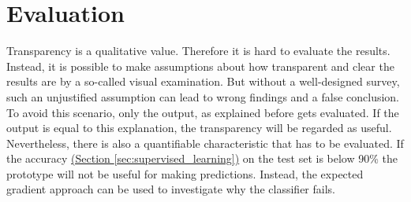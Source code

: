 \section{Evaluation}

Transparency is a qualitative value. Therefore it is hard to evaluate the results. Instead, it is possible to make assumptions about how transparent and clear the results are by a so-called visual examination. But without a well-designed survey, such an unjustified assumption can lead to wrong findings and a false conclusion. To avoid this scenario, only the output, as explained before gets evaluated. If the output is equal to this explanation, the transparency will be regarded as useful.\\

Nevertheless, there is also a quantifiable characteristic that has to be evaluated. If the accuracy \hyperref[sec:supervised_learning]{(Section \ref{sec:supervised_learning})} on the test set is below 90\% the prototype will not be useful for making predictions. Instead, the expected gradient approach can be used to investigate why the classifier fails. 
